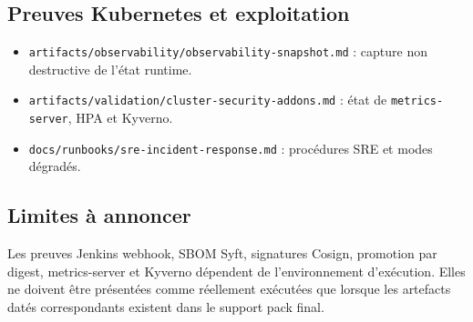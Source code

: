 \subsection{Preuves Kubernetes et exploitation}

\begin{itemize}
  \item \texttt{artifacts/observability/observability-snapshot.md} : capture
  non destructive de l'état runtime.
  \item \texttt{artifacts/validation/cluster-security-addons.md} : état de
  \texttt{metrics-server}, HPA et Kyverno.
  \item \texttt{docs/runbooks/sre-incident-response.md} : procédures SRE et
  modes dégradés.
\end{itemize}

\subsection{Limites à annoncer}

Les preuves Jenkins webhook, SBOM Syft, signatures Cosign, promotion par digest,
metrics-server et Kyverno dépendent de l'environnement d'exécution. Elles ne
doivent être présentées comme réellement exécutées que lorsque les artefacts
datés correspondants existent dans le support pack final.
